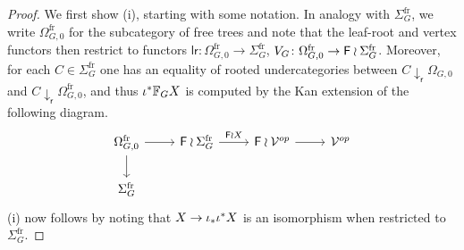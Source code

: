 \documentclass[a4paper,10pt]{article}%
\begin{document}
\begin{proof}
  We first show (i), starting with some notation. 
  In analogy with $\Sigma_{G}^{\text{fr}}$,
  we write $\Omega_{G,0}^{\text{fr}}$ for the subcategory of free trees and note that the leaf-root and vertex functors then restrict to functors
  $\mathsf{lr} \colon \Omega_{G,0}^{\text{fr}} \to \Sigma_G^{\text{fr}}$,
  $V_G \colon \Omega_{G,0}^{\text{fr}} \to \mathsf{F} \wr \Sigma_G^{\text{fr}}$.
  Moreover, for each $C \in \Sigma_G^{\text{fr}}$ one has an equality of rooted undercategories between
  $C \downarrow_{\mathsf{r}} \Omega_{G,0}$
  and
  $C \downarrow_{\mathsf{r}} \Omega_{G,0}^{\text{fr}}$,
  and thus 
  $\iota^{\**} \mathbb{F}_G X$ is computed by the Kan extension of the following diagram.
  \begin{equation}\label{IFGI EQ}
    \begin{tikzcd}
      \Omega_{G,0}^{\text{fr}} \ar{d} \ar{r} &
      \Fin \wr \Sigma_G^{\text{fr}} \ar{r}{\Fin \wr X} &
      \Fin \wr \mathcal{V}^{op} \ar{r} &
      \mathcal{V}^{op}
      \\
      \Sigma_G^{\text{fr}}
    \end{tikzcd}
  \end{equation}
  (i) now follows by noting that 
  $X \to \iota_{\**} \iota^{\**} X$
  is an isomorphism when restricted to $\Sigma_G^{\text{fr}}$.


\end{proof}
\end{document}
